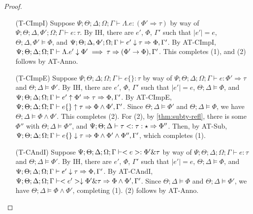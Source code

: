 \begin{proof}
\begin{itemize}
  \item[(T-CImpI)] Suppose
  $\Psi ; \Theta ; \Delta ; \Omega ; \Gamma \vdash \Lambda .e : (\Phi' \Rightarrow \tau)$ by way of
  $\Psi ; \Theta ; \Delta,\Phi' ; \Omega ; \Gamma \vdash e : \tau$.
  By IH, there are $e'$, $\Phi$, $\Gamma'$ such that
  $|e'| = e$,
  $\Theta ; \Delta,\Phi' \vDash \Phi$, and
  $\Psi ; \Theta ; \Delta,\Phi'; \Omega ; \Gamma \vdash e' \downarrow \tau \Rightarrow \Phi,\Gamma'$.
  By AT-CImpI,
  $\Psi ; \Theta ; \Delta ; \Omega ; \Gamma \vdash \Lambda. e' \downarrow \Phi' \implies \tau \Rightarrow (\Phi' \to \Phi),\Gamma'$.
  This completes (1), and (2) follows by AT-Anno.
  
  \item[(T-CImpE)] Suppose
  $\Psi ; \Theta ; \Delta ; \Omega ; \Gamma \vdash e \{\} : \tau$ by way of
  $\Psi ; \Theta ; \Delta ; \Omega ; \Gamma \vdash e : \Phi' \Rightarrow \tau$ and
  $\Theta ; \Delta \vDash \Phi'$.
  By IH, there are $e'$, $\Phi$, $\Gamma'$ such that
  $|e'| = e$,
  $\Theta ; \Delta \vDash \Phi$, and
  $\Psi ; \Theta ; \Delta ; \Omega ; \Gamma \vdash e' \uparrow \Phi' \Rightarrow \tau \Rightarrow \Phi,\Gamma'$.
  By AT-CImpE,
  $\Psi ; \Theta ; \Delta ; \Omega ; \Gamma \vdash e \{\} \uparrow \tau \Rightarrow \Phi \wedge \Phi',\Gamma'$.
  Since $\Theta ; \Delta \vDash \Phi'$ and $\Theta ; \Delta \vDash \Phi$, we have $\Theta ; \Delta \vDash \Phi \wedge \Phi'$.
  This completes (2). For (2),
  by \autoref{thm:subty-refl}, there is some $\Phi''$ with
  $\Theta ; \Delta \vDash \Phi''$, and
  $\Psi ; \Theta ; \Delta \vdash \tau <: \tau : \star \Rightarrow \Phi''$.
  Then, by AT-Sub,
  $\Psi ; \Theta ; \Delta ; \Omega ; \Gamma \vdash e \{\} \downarrow \tau \Rightarrow \Phi \wedge \Phi' \wedge \Phi'',\Gamma'$,
  which completes (1).
  
  \item[(T-CAndI)] Suppose
  $\Psi ; \Theta ; \Delta ; \Omega ; \Gamma \vdash <e> : \Phi' \& \tau$ by way of
  $\Psi ; \Theta ; \Delta ; \Omega ; \Gamma \vdash e : \tau$ and
  $\Theta ; \Delta \vDash \Phi'$.
  By IH, there are $e'$, $\Phi$, $\Gamma'$ such that
  $|e'| = e$,
  $\Theta ; \Delta \vDash \Phi$, and
  $\Psi  ; \Theta ; \Delta ; \Omega ; \Gamma \vdash e' \downarrow \tau \Rightarrow \Phi,\Gamma'$.
  By AT-CAndI,
  $\Psi; \Theta ; \Delta ; \Omega ; \Gamma \vdash <e'> \downarrow \Phi' \& \tau \Rightarrow \Phi \wedge \Phi',\Gamma'$.
  Since $\Theta ; \Delta \vDash \Phi$ and $\Theta ; \Delta \vDash \Phi'$, we have $\Theta ; \Delta \vDash \Phi \wedge \Phi'$,
  completing (1). (2) follows by AT-Anno.
  

\end{itemize}
\end{proof}
